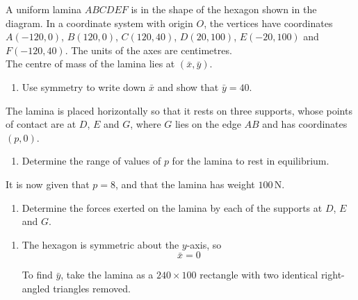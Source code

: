 \documentclass[leqno]{article}
\begin{document}
\begin{enumerate}[
  label=\textbf{\arabic*.},
  leftmargin=*,
  topsep=0pt,
  partopsep=0pt,
  parsep=0pt
]
\begin{figure}[H]
\end{figure}


A uniform lamina $ABCDEF$ is in the shape of the hexagon shown in the diagram. In a coordinate system with origin $O$, the vertices have coordinates $A(-120,0)$, $B(120,0)$, $C(120,40)$, $D(20,100)$, $E(-20,100)$ and $F(-120,40)$. The units of the axes are centimetres. \\

The centre of mass of the lamina lies at $(\bar{x},\bar{y})$. \\
\begin{enumerate}[label=\textbf{(\alph*)}]
  \item Use symmetry to write down $\bar{x}$ and show that $\bar{y}=40$.  \\
\end{enumerate}
The lamina is placed horizontally so that it rests on three supports, whose points of contact are at $D$, $E$ and $G$, where $G$ lies on the edge $AB$ and has coordinates $(p,0)$. \\
\begin{enumerate}[label=\textbf{(\alph*)}, resume]
  \item Determine the range of values of $p$ for the lamina to rest in equilibrium.  \\
\end{enumerate}
It is now given that $p=8$, and that the lamina has weight $100\,\mathrm{N}$. \\
\begin{enumerate}[label=\textbf{(\alph*)}, resume]
  \item Determine the forces exerted on the lamina by each of the supports at $D$, $E$ and $G$.  \\
\end{enumerate}

\vspace*{10pt}

\begin{djsSolution}
\begin{enumerate}[label=\textbf{(\alph*)}, start=1]
\item The hexagon is symmetric about the \(y\)-axis, so
\[
\bar{x}=0
\]

To find \(\bar{y}\), take the lamina as a \(240\times 100\) rectangle with two identical right-angled triangles removed.


\end{enumerate}
\end{djsSolution}
\end{enumerate}
\end{document}
